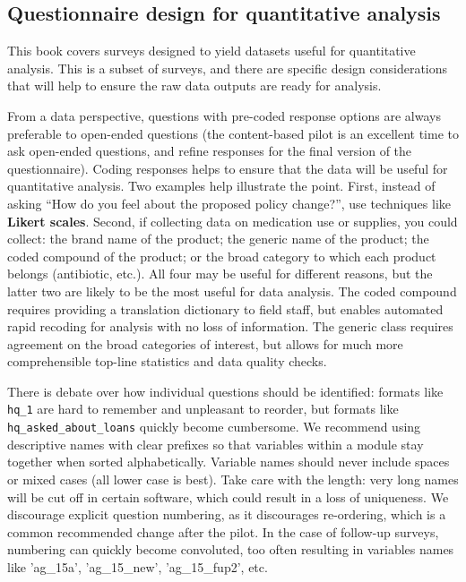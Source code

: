 \subsection{Questionnaire design for quantitative analysis}
This book covers surveys designed to yield datasets useful for quantitative analysis. This is a subset of surveys, and there are specific design considerations that will help to ensure the raw data outputs are ready for analysis.

From a data perspective, questions with pre-coded response options are always preferable to open-ended questions (the content-based pilot is an excellent time to ask open-ended questions, and refine responses for the final version of the questionnaire). Coding responses helps to ensure that the data will be useful for quantitative analysis. Two examples help illustrate the point. First, instead of asking ``How do you feel about the proposed policy change?'', use techniques like
\textbf{Likert scales}. Second, if collecting data on medication use or supplies, you could collect: the brand name of the product; the generic name of the product; the coded compound of the product; or the broad category to which each product belongs (antibiotic, etc.). All four may be useful for different reasons, but the latter two are likely to be the most useful for data analysis. The coded compound requires providing a translation dictionary to field staff, but enables automated rapid recoding for analysis with no loss of information. The generic class requires agreement on the broad categories of interest, but allows for much more comprehensible top-line statistics and data quality checks.

There is debate over how individual questions should be identified: formats like \texttt{hq\_1} are hard to remember and unpleasant to reorder, but formats like \texttt{hq\_asked\_about\_loans} quickly become cumbersome.
We recommend using descriptive names with clear prefixes so that variables 
within a module stay together when sorted 
alphabetically.
 Variable names should never include spaces or mixed cases (all lower case is 
best). Take care with the length: very long names will be cut off in certain 
software, which could result in a loss of uniqueness. We discourage explicit 
question numbering, as it discourages re-ordering, which is a common 
recommended change after the pilot. In the case of follow-up surveys, numbering 
can quickly become convoluted, too often resulting in variables names like 
'ag\_15a', 'ag\_15\_new', 'ag\_15\_fup2', etc.

